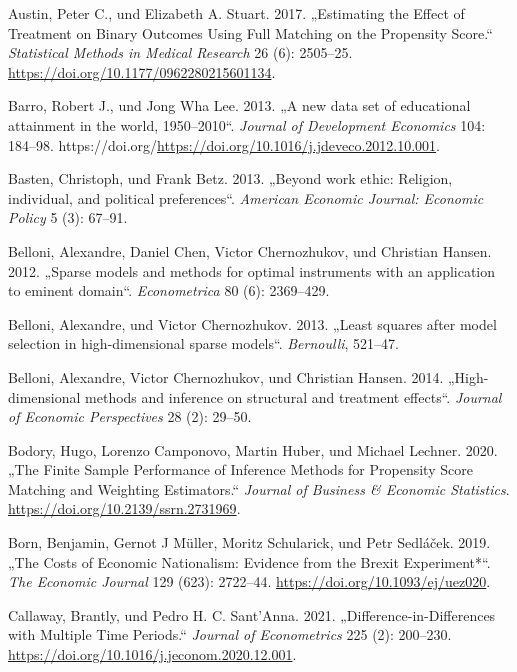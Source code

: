 \documentclass[
  a4paper,
  DIV=11,
  oneside]{scrreprt}
\newlength{\cslhangindent}
\newenvironment{CSLReferences}[2] %
 {\begin{list}{}{%
  \setlength{\itemindent}{0pt}
  \setlength{\leftmargin}{0pt}
  \setlength{\parsep}{0pt}
  \ifodd #1
   \setlength{\leftmargin}{\cslhangindent}
   \setlength{\itemindent}{-1\cslhangindent}
  \fi
  \setlength{\itemsep}{#2\baselineskip}}}
 {\end{list}}
\begin{document}
\begin{CSLReferences}{1}{0}
Austin, Peter C., und Elizabeth A. Stuart. 2017. {„Estimating the Effect
of Treatment on Binary Outcomes Using Full Matching on the Propensity
Score.``} \emph{Statistical Methods in Medical Research} 26 (6):
2505--25. \url{https://doi.org/10.1177/0962280215601134}.

Barro, Robert J., und Jong Wha Lee. 2013. {„A new data set of
educational attainment in the world, 1950--2010``}. \emph{Journal of
Development Economics} 104: 184--98.
https://doi.org/\url{https://doi.org/10.1016/j.jdeveco.2012.10.001}.

Basten, Christoph, und Frank Betz. 2013. {„Beyond work ethic: Religion,
individual, and political preferences``}. \emph{American Economic
Journal: Economic Policy} 5 (3): 67--91.

Belloni, Alexandre, Daniel Chen, Victor Chernozhukov, und Christian
Hansen. 2012. {„Sparse models and methods for optimal instruments with
an application to eminent domain``}. \emph{Econometrica} 80 (6):
2369--429.

Belloni, Alexandre, und Victor Chernozhukov. 2013. {„Least squares after
model selection in high-dimensional sparse models``}. \emph{Bernoulli},
521--47.

Belloni, Alexandre, Victor Chernozhukov, und Christian Hansen. 2014.
{„High-dimensional methods and inference on structural and treatment
effects``}. \emph{Journal of Economic Perspectives} 28 (2): 29--50.

Bodory, Hugo, Lorenzo Camponovo, Martin Huber, und Michael Lechner.
2020. {„The Finite Sample Performance of Inference Methods for
Propensity Score Matching and Weighting Estimators.``} \emph{Journal of
Business \& Economic Statistics}.
\url{https://doi.org/10.2139/ssrn.2731969}.

Born, Benjamin, Gernot J Müller, Moritz Schularick, und Petr Sedláček.
2019. {„The Costs of Economic Nationalism: Evidence from the Brexit
Experiment*``}. \emph{The Economic Journal} 129 (623): 2722--44.
\url{https://doi.org/10.1093/ej/uez020}.

Callaway, Brantly, und Pedro H. C. Sant'Anna. 2021.
{„Difference-in-Differences with Multiple Time Periods.``} \emph{Journal
of Econometrics} 225 (2): 200--230.
\url{https://doi.org/10.1016/j.jeconom.2020.12.001}.


\end{CSLReferences}
\end{document}
